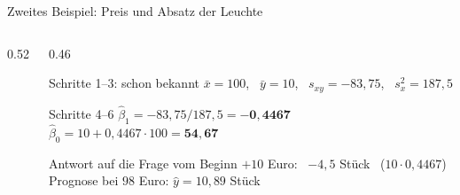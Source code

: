 \documentclass[aspectratio=169,11pt]{beamer}
\def\leuchteliste{80/20,85/17,90/15,95/9,100/11,105/8,110/4,115/4,120/2}
\newcommand{\leuchtepunkte}{\addplot[only marks, mark=*, mark size=2.2pt, color=hsbiblue]
  coordinates {(80,20) (85,17) (90,15) (95,9) (100,11) (105,8) (110,4) (115,4) (120,2)};}
\newcommand{\residuenvon}[4]{%
  \foreach \px/\py in #1 {%
    \pgfmathsetmacro{\yh}{#2 + #3*\px}%
    \edef\tmpdraw{\noexpand\draw[#4] (axis cs:\px,\py) -- (axis cs:\px,\yh);}%
    \tmpdraw
  }}
\begin{document}
\begin{frame}{Zweites Beispiel: Preis und Absatz der Leuchte}
  \begin{columns}[T]
    \begin{column}{0.52\textwidth}
    \end{column}
    \begin{column}{0.46\textwidth}
      \begin{block}{Schritte 1--3: schon bekannt}
        $\bar{x} = 100$, \ $\bar{y} = 10$, \ $s_{xy} = -83{,}75$, \ $s_x^{2} = 187{,}5$
      \end{block}
      \begin{block}{Schritte 4--6}
        $\hat{\beta}_1 = -83{,}75 / 187{,}5 = \mathbf{-0{,}4467}$\\[2pt]
        $\hat{\beta}_0 = 10 + 0{,}4467 \cdot 100 = \mathbf{54{,}67}$
      \end{block}
      \begin{exampleblock}{Antwort auf die Frage vom Beginn}
        $+10$ Euro: \ $-4{,}5$ Stück \ ($10 \cdot 0{,}4467$)\\
        Prognose bei $98$ Euro: $\hat{y} = 10{,}89$ Stück
      \end{exampleblock}
    \end{column}
  \end{columns}
\end{frame}
\end{document}
